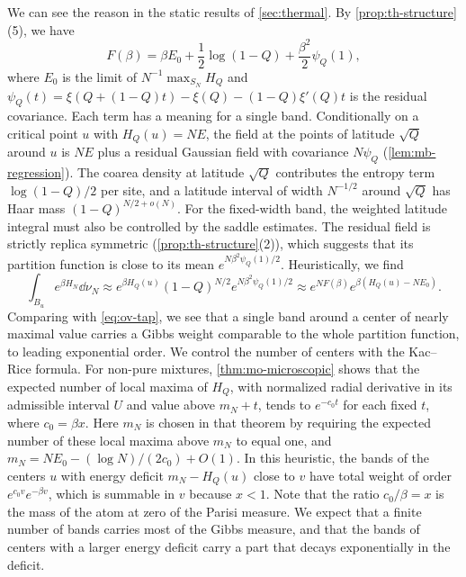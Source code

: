 We can see the reason in the static results of \cref{sec:thermal}. By \cref{prop:th-structure}(5), we have
\begin{equation}\label{eq:ov-tap}
F(\beta)=\beta E_0+\frac12\log(1-Q)+\frac{\beta^2}2\psi_Q(1),
\end{equation}
where $E_0$ is the limit of $N^{-1}\max_{S_N}H_Q$ and $\psi_Q(t)=\xi(Q+(1-Q)t)-\xi(Q)-(1-Q)\xi'(Q)t$ is the residual covariance. Each term has a meaning for a single band. Conditionally on a critical point $u$ with $H_Q(u)=NE$, the field at the points of latitude $\sqrt Q$ around $u$ is $NE$ plus a residual Gaussian field with covariance $N\psi_Q$ (\cref{lem:mb-regression}). The coarea density at latitude $\sqrt Q$ contributes the entropy term $\log(1-Q)/2$ per site, and a latitude interval of width $N^{-1/2}$ around $\sqrt Q$ has Haar mass $(1-Q)^{N/2+o(N)}$. For the fixed-width band, the weighted latitude integral must also be controlled by the saddle estimates. The residual field is strictly replica symmetric (\cref{prop:th-structure}(2)), which suggests that its partition function is close to its mean $e^{N\beta^2\psi_Q(1)/2}$. Heuristically, we find
\begin{equation}\label{eq:ov-band-weight}
\int_{B_u}e^{\beta H_N}\dd\nu_N\approx e^{\beta H_Q(u)}(1-Q)^{N/2}e^{N\beta^2\psi_Q(1)/2}\approx e^{NF(\beta)}e^{\beta(H_Q(u)-NE_0)}.
\end{equation}
Comparing with \eqref{eq:ov-tap}, we see that a single band around a center of nearly maximal value carries a Gibbs weight comparable to the whole partition function, to leading exponential order. We control the number of centers with the Kac--Rice formula. For non-pure mixtures, \cref{thm:mo-microscopic} shows that the expected number of local maxima of $H_Q$, with normalized radial derivative in its admissible interval $U$ and value above $m_N+t$, tends to $e^{-c_0t}$ for each fixed $t$, where $c_0=\beta x$. Here $m_N$ is chosen in that theorem by requiring the expected number of these local maxima above $m_N$ to equal one, and $m_N=NE_0-(\log N)/(2c_0)+O(1)$. In this heuristic, the bands of the centers $u$ with energy deficit $m_N-H_Q(u)$ close to $v$ have total weight of order $e^{c_0v}e^{-\beta v}$, which is summable in $v$ because $x<1$. Note that the ratio $c_0/\beta=x$ is the mass of the atom at zero of the Parisi measure. We expect that a finite number of bands carries most of the Gibbs measure, and that the bands of centers with a larger energy deficit carry a part that decays exponentially in the deficit.

